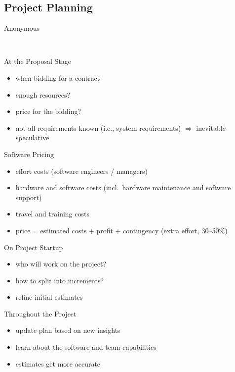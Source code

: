 \subsection{Project Planning}
\begin{frame}{\insertsubsection}
	\begin{fancycolumns}
		\begin{note}{{Anonymous}} %
		\end{note}
	\end{fancycolumns}
\end{frame}

\begin{frame}{\insertsubsection\ \mytitlesource{\sommerville}}
	\begin{fancycolumns}
		\begin{note}{At the Proposal Stage}
			\begin{itemize}
				\item when bidding for a contract
				\item enough resources?
				\item price for the bidding?
				\item not all requirements known (i.e., system requirements) $\Rightarrow$ inevitable speculative
			\end{itemize}
		\end{note}
		\pause
		\begin{example}{Software Pricing}
			\begin{itemize}
				\item effort costs (software engineers / managers)
				\item hardware and software costs (incl.\ hardware maintenance and software support)
				\item travel and training costs
				\item price = estimated costs + profit + contingency (extra effort, 30--50\%)
			\end{itemize}
		\end{example}
		\nextcolumn
		\pause
		\begin{note}{On Project Startup}
			\begin{itemize}
				\item who will work on the project?
				\item how to split into increments?
				\item refine initial estimates
			\end{itemize}
		\end{note}
		\pause
		\begin{note}{Throughout the Project}
			\begin{itemize}
				\item update plan based on new insights
				\item learn about the software and team capabilities
				\item estimates get more accurate
			\end{itemize}
		\end{note}
	\end{fancycolumns}
\end{frame}


